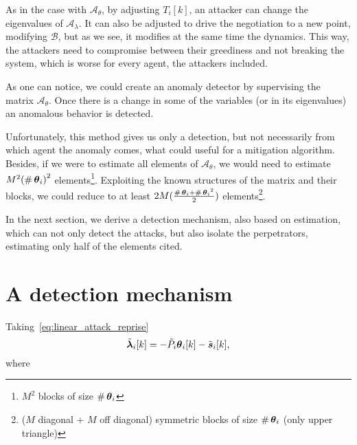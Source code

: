 \documentclass[../main.tex]{subfiles}
\begin{document}
As in the case with $\mathcal{A}_{\theta}$, by adjusting $T_{i}[k]$, an attacker can change the eigenvalues of $\mathcal{A}_{\lambda}$.
It can also be adjusted to drive the negotiation to a new point, modifying $\mathcal{B}$, but as we see, it modifies at the same time the dynamics.
This way, the attackers need to compromise between their greediness and not breaking the system, which is worse for every agent, the attackers included.

As one can notice, we could create an anomaly detector by supervising the matrix $\mathcal{A}_{\theta}$.
Once there is a change in some of the variables (or in its eigenvalues) an anomalous behavior is detected.

Unfortunately, this method gives us only a detection, but not necessarily from which agent the anomaly comes, what could useful for a mitigation algorithm.
Besides, if we were to estimate all elements of $\mathcal{A}_{\theta}$, we would need to estimate $M^{2}{(\operatorname{\#}\boldsymbol{\theta}_i)}^{2}$ elements\footnote{$M^{2}$ blocks of size ${\operatorname{\#}\boldsymbol{\theta}_i}$}.
Exploiting the known structures of the matrix and their blocks, we could reduce to at least $2M{(\frac{\operatorname{\#}\boldsymbol{\theta}_i+{\operatorname{\#}\boldsymbol{\theta}_i}^{2}}{2})}$ elements\footnote{($M$ diagonal + $M$ off diagonal) symmetric blocks of size ${\operatorname{\#}\boldsymbol{\theta}_i}$ (only upper triangle)}.

In the next section, we derive a detection mechanism, also based on estimation, which can not only detect the attacks, but also isolate the perpetrators, estimating only half of the elements cited.

\section{A detection mechanism}\label{sec:detection-mechanism}

Taking~\eqref{eq:linear_attack_reprise}
\begin{equation}
  \label{eq:lambda_function_theta_tilde}
\tilde{\vec{\lambda}}_{i}[k]=-\tilde{P}_{i}\thetaik-\tilde{\vec{s}}_{i}[k],
\end{equation}
where


\end{document}
